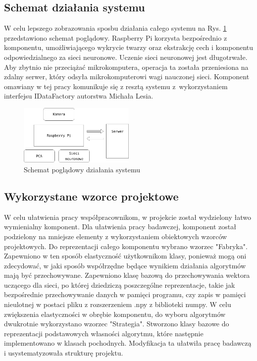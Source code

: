 \documentclass[oneside, eng]{mgr}
\begin{document}
\subsection{Schemat działania systemu}

W celu lepszego zobrazowania sposbu działania całego systemu na Rys. \ref{fig:schemat_pogl} przedstawiono schemat poglądowy. Raspberry Pi korzysta bezpośrednio z komponentu, umożliwiającego wykrycie twarzy oraz ekstrakcję cech i komponentu odpowiedzialnego za sieci neuronowe. Uczenie sieci neuronowej jest długotrwałe. Aby zbytnio nie przeciążać mikrokomputera, operacja ta została przeniesiona na zdalny serwer, który odsyła mikrokomputerowi wagi nauczonej sieci. Komponent omawiany w tej pracy komunikuje się z resztą systemu z~wykorzystaniem interfejsu IDataFactory autorstwa Michała Lesia.

\begin{figure}
\centering
	\includegraphics[width=0.50\textwidth,natwidth=610,natheight=642]{img/schemat_pogladowy.jpg}\par\vspace{0.5cm}
\caption{Schemat poglądowy działania systemu}
	\label{fig:schemat_pogl}
\end{figure}



\subsection{Wykorzystane wzorce projektowe}

W celu ułatwienia pracy współpracownikom, w projekcie został wydzielony łatwo wymienialny komponent. Dla ułatwienia pracy badawczej, komponent został podzielony na mniejsze elementy z wykorzystaniem obiektowych wzorców projektowych.
Do reprezentacji całego komponentu wybrano wzorzec "Fabryka". Zapewniono w ten sposób elastyczność użytkownikom klasy, ponieważ mogą oni zdecydować, w jaki sposób współrzędne będące wynikiem działania algorytmów mają być przechowywane. Zapewniono klasę bazową do przechowywania wektora uczącego dla sieci, po której dziedziczą poszczególne reprezentacje, takie jak bezpośrednie przechowywanie danych w pamięci programu, czy zapis w pamięci nieulotnej w postaci pliku z rozszerzeniem .npy z biblioteki numpy.
W celu zwiększenia elastyczności w obrębie komponentu, do wyboru algorytmów dwukrotnie wykorzystano wzorzec "Strategia". Stworzono klasy bazowe do reprezentacji podstawowych własności algorytmu, które następnie implementowano w klasach pochodnych. Modyfikacja ta ułatwiła pracę badawczą i usystematyzowała strukturę projektu.
\end{document}
